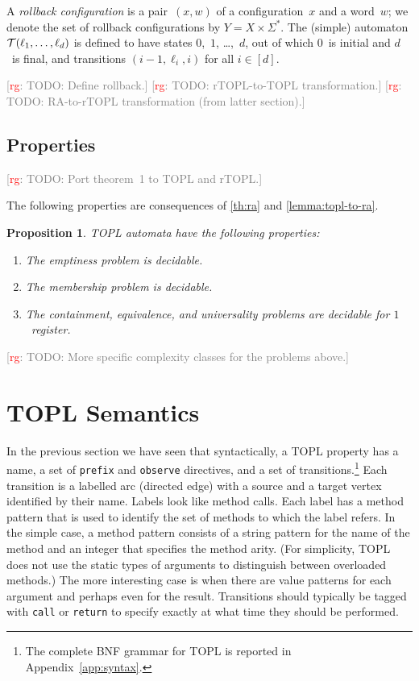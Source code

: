 \documentclass[9pt, preprint]{sigplanconf} %
\newcommand{\noterg}[2]{\textcolor{gray}{[\textcolor{red}{#1}: #2]}}
\newcommand{\rg}[1]{\noterg{rg}{#1}}
\newtheorem{proposition}{Proposition}
\theoremstyle{definition}
\theoremstyle{remark}
\begin{document}
A \emph{rollback configuration} is a pair~$(x,w)$ of a configuration~$x$ and a word~$w$;
we denote the set of rollback configurations by $Y=X\times\Sigma^*$.
The (simple) automaton ${\cal T}(\ell_1,\ldots,\ell_d)$ is defined to have states $0$,~$1$, \dots,~$d$, out of which $0$~is initial and $d$~is final, and transitions $(i-1,\ell_i,i)$ for all $i\in[d]$.

\rg{TODO: Define rollback.}
\rg{TODO: rTOPL-to-TOPL transformation.}
\rg{TODO: RA-to-rTOPL transformation (from latter section).}

\subsection{Properties}

\rg{TODO: Port theorem~1 to TOPL and rTOPL.}


The following properties are consequences of \autoref{th:ra} and \autoref{lemma:topl-to-ra}.

\begin{proposition}
TOPL automata have the following properties:
\begin{enumerate}
\item The emptiness problem is decidable.
\item The membership problem is decidable.
\item The containment, equivalence, and universality problems are decidable for $1$~register.
\end{enumerate}
\end{proposition}
\rg{TODO: More specific complexity classes for the problems above.}

\section{TOPL  Semantics}\label{sec:semantics} %
In the previous section we have seen that syntactically, a TOPL property has a name, a set of {\tt prefix} and {\tt observe} directives, and a set of transitions.\footnote{The complete BNF grammar for TOPL is reported in Appendix~\ref{app:syntax}.}
Each transition is a labelled arc (directed edge) with a source and a target vertex identified by their name.
Labels look like method calls.
Each label has a method pattern that is used to identify the set of methods to which the label refers.
In the simple case, a method pattern consists of a string pattern for the name of the method and an integer that specifies the method arity.
(For simplicity, TOPL does not use the static types of arguments to distinguish between overloaded methods.)
The more interesting case is when there are value patterns for each argument and perhaps even for the result.
Transitions should typically be tagged with \texttt{call} or \texttt{return} to specify exactly at what time they should be performed.
\end{document}
